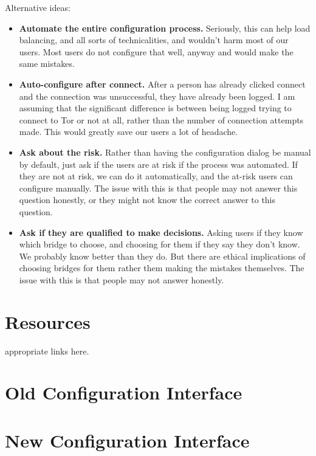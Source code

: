 \documentclass{template}
\begin{document}
Alternative ideas: 
\begin{itemize} \itemsep1pt \parskip0pt  
\item{\bfseries Automate the entire configuration process.} Seriously, this can help load balancing, and all sorts of technicalities, and wouldn't harm most of our users. Most users do not configure that well, anyway and would make the same mistakes. 
\item {\bfseries Auto-configure after connect.} After a person has already clicked connect and the connection was unsuccessful, they have already been logged. I am assuming that the significant difference is between being logged trying to connect to Tor or not at all, rather than the number of connection attempts made. This would greatly save our users a lot of headache. 
\item{\bfseries Ask about the risk.} Rather than having the configuration dialog be manual by default, just ask if the users are at risk if the process was automated. If they are not at risk, we can do it automatically, and the at-risk users can configure manually. The issue with this is that people may not answer this question honestly, or they might not know the correct answer to this question. 
\item{\bfseries Ask if they are qualified to make decisions.} Asking users if they know which bridge to choose, and choosing for them if they say they don't know. We probably know better than they do. But there are ethical implications of choosing bridges for them rather them making the mistakes themselves. The issue with this is that people may not answer honestly. 
\end{itemize}

\section{Resources}
{\color {red} appropriate links here.}


 

\appendix
\section*{Old Configuration Interface}
\section*{New Configuration Interface}
\end{document}
